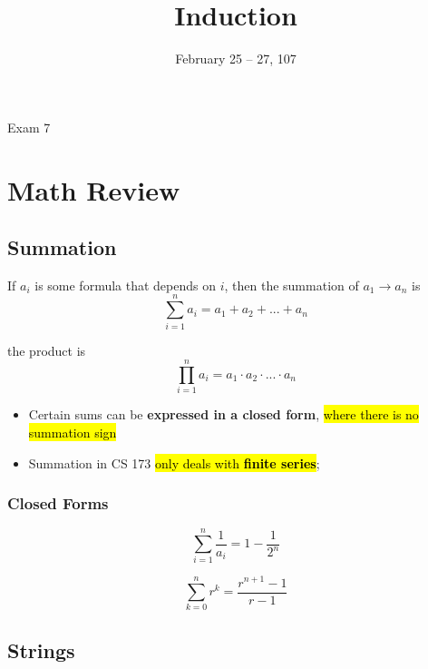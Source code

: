 \documentclass{note}
\date{February 25 -- 27, 107}
\title{Induction}
\begin{document}
    \begin{note}{Exam 7}

        \section{Math Review}

        \subsection{Summation}

        If $ a_{i} $ is some formula that depends on $ i $, then the summation of $ a_{1} \to a_{n} $ is
        \begin{equation}\label{eq: summation}
            \sum_{i=1}^{n} a_{i} = a_{1} + a_{2} + ... + a_{n}
        \end{equation}

        the product is
        \begin{equation}\label{eq: product}
            \prod_{i = 1}^{n} a_{i} = a_{1} \cdot a_{2} \cdot ... \cdot a_{n}
        \end{equation}

        \begin{itemize}
            \item Certain sums can be \textbf{expressed in a closed form}, \hl{where there is no summation sign}
            \item Summation in CS 173 \hl{only deals with \textbf{finite series}};
        \end{itemize}

        \subsubsection{Closed Forms}

        \begin{equation}\label{eq: closed form 1}
            \sum_{i = 1}^{n} \frac{1}{a_{i}} = 1 - \frac{1}{2^{n}}
        \end{equation}

        \begin{equation}\label{eq: geometric series}
            \sum_{k = 0}^{n} r^{k} = \frac{r^{n + 1} - 1}{r - 1}
        \end{equation}

	\subsection{Strings}


\end{note}
\end{document}
